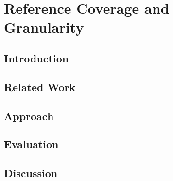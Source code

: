 \chapter{Reference Coverage and Granularity}

\section{Introduction}
\Blindtext[1]

\section{Related Work}
\Blindtext[1]

\section{Approach}
\Blindtext[1]

\section{Evaluation}
\Blindtext[1]

\section{Discussion}
\Blindtext[1]
